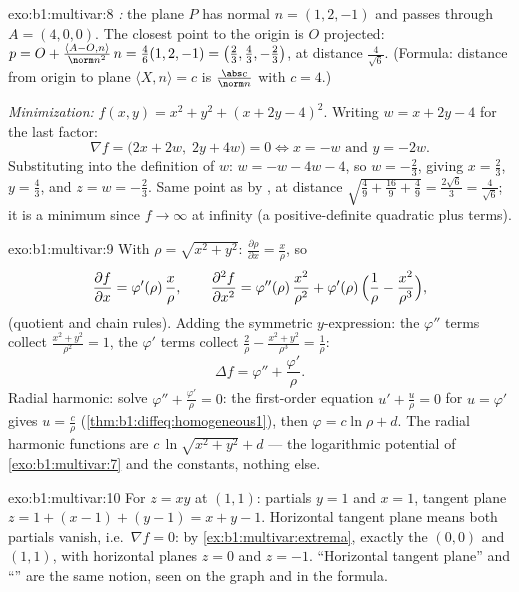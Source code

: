 \begin{solution}{exo:b1:multivar:8}
\emph{:} the plane $P$ has normal $n = (1, 2, -1)$ and
passes through $A = (4, 0, 0)$. The closest point to the origin is
$O$ projected: $p = O + \frac{\langle A - O, n\rangle}{\norm
n^2}\,n = \frac{4}{6}(1,2,-1) = \bigl(\frac23, \frac43,
-\frac23\bigr)$, at distance $\frac{4}{\sqrt 6}$. (Formula: distance
from origin to plane $\langle X, n \rangle = c$ is
$\frac{\abs c}{\norm n}$ with $c = 4$.)

\emph{Minimization:} $f(x,y) = x^2 + y^2 + (x + 2y - 4)^2$. Writing
$w = x + 2y - 4$ for the last factor:
\[
\nabla f = \bigl(2x + 2w,\; 2y + 4w\bigr) = 0
\iff x = -w \text{ and } y = -2w .
\]
Substituting into the definition of $w$: $w = -w - 4w - 4$, so $w =
-\frac23$, giving $x = \frac23$, $y = \frac43$, and $z = w =
-\frac23$. Same point as by , at distance
$\sqrt{\frac49 + \frac{16}{9} + \frac49} = \frac{2\sqrt 6}{3} =
\frac{4}{\sqrt6}$; it is a minimum since $f \to \infty$ at infinity
(a positive-definite quadratic plus  terms).
\end{solution}

\begin{solution}{exo:b1:multivar:9}
With $\rho = \sqrt{x^2+y^2}$: $\frac{\partial \rho}{\partial x} =
\frac{x}{\rho}$, so
\[
\frac{\partial f}{\partial x} = \varphi'(\rho)\,\frac{x}{\rho},
\qquad
\frac{\partial^2 f}{\partial x^2}
= \varphi''(\rho)\,\frac{x^2}{\rho^2}
+ \varphi'(\rho)\,\Bigl(\frac{1}{\rho} -
\frac{x^2}{\rho^3}\Bigr),
\]
(quotient and chain rules). Adding the symmetric $y$-expression:
the $\varphi''$ terms collect $\frac{x^2 + y^2}{\rho^2} = 1$, the
$\varphi'$ terms collect $\frac{2}{\rho} - \frac{x^2 +
y^2}{\rho^3} = \frac{1}{\rho}$:
\[
\Delta f = \varphi'' + \frac{\varphi'}{\rho} .
\]
Radial harmonic: solve $\varphi'' + \frac{\varphi'}{\rho} = 0$: the
first-order equation $u' + \frac u\rho = 0$ for $u = \varphi'$
gives $u = \frac{c}{\rho}$ (\cref{thm:b1:diffeq:homogeneous1}),
then $\varphi = c\ln\rho + d$. The radial harmonic functions are
$c\,\ln\sqrt{x^2 + y^2} + d$ --- the logarithmic potential of
\cref{exo:b1:multivar:7} and the constants, nothing else.
\end{solution}

\begin{solution}{exo:b1:multivar:10}
For $z = xy$ at $(1,1)$: partials $y = 1$ and $x = 1$, tangent
plane $z = 1 + (x - 1) + (y - 1) = x + y - 1$. Horizontal
tangent plane means both partials vanish, i.e.\ $\nabla f = 0$:
by \cref{ex:b1:multivar:extrema}, exactly the 
$(0, 0)$ and $(1, 1)$, with horizontal planes $z = 0$ and $z =
-1$. ``Horizontal tangent plane'' and ``'' are the
same notion, seen on the graph and in the formula.
\end{solution}

